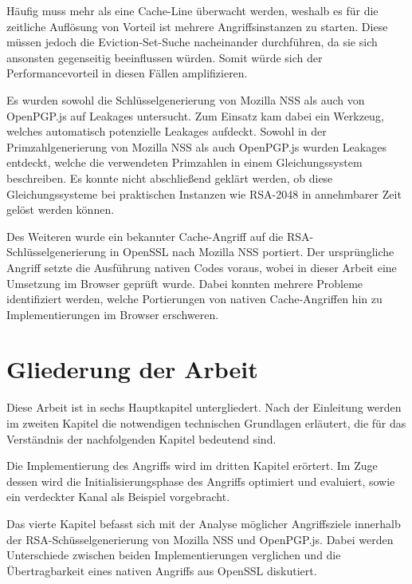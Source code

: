 Häufig muss mehr als eine Cache-Line überwacht werden, weshalb es für die zeitliche Auflösung von Vorteil ist mehrere Angriffsinstanzen zu starten.
Diese müssen jedoch die Eviction-Set-Suche nacheinander durchführen, da sie sich ansonsten gegenseitig beeinflussen würden.
Somit würde sich der Performancevorteil in diesen Fällen amplifizieren.

\par\medskip

Es wurden sowohl die Schlüsselgenerierung von Mozilla NSS als auch von OpenPGP.js auf Leakages untersucht. 
Zum Einsatz kam dabei ein Werkzeug, welches automatisch potenzielle Leakages aufdeckt.
Sowohl in der Primzahlgenerierung von Mozilla NSS als auch OpenPGP.js wurden Leakages entdeckt, welche die verwendeten Primzahlen in einem Gleichungssystem beschreiben.
Es konnte nicht abschließend geklärt werden, ob diese Gleichungssysteme bei praktischen Instanzen wie RSA-2048 in annehmbarer Zeit gelöst werden können.

Des Weiteren wurde ein bekannter Cache-Angriff auf die RSA-Schlüsselgenerierung in OpenSSL nach Mozilla NSS portiert.
Der ursprüngliche Angriff setzte die Ausführung nativen Codes voraus, wobei in dieser Arbeit eine Umsetzung im Browser geprüft wurde.
Dabei konnten mehrere Probleme identifiziert werden, welche Portierungen von nativen Cache-Angriffen hin zu Implementierungen im Browser erschweren. 

\section{Gliederung der Arbeit}
Diese Arbeit ist in sechs Hauptkapitel untergliedert. 
Nach der Einleitung werden im zweiten Kapitel die notwendigen technischen Grundlagen erläutert, die für das Verständnis der nachfolgenden Kapitel bedeutend sind.

Die Implementierung des Angriffs wird im dritten Kapitel erörtert. 
Im Zuge dessen wird die Initialisierungsphase des Angriffs optimiert und evaluiert, sowie ein verdeckter Kanal als Beispiel vorgebracht. 

Das vierte Kapitel befasst sich mit der Analyse möglicher Angriffsziele innerhalb der RSA-Schüsselgenerierung von Mozilla NSS und OpenPGP.js.
Dabei werden Unterschiede zwischen beiden Implementierungen verglichen und die Übertragbarkeit eines nativen Angriffs aus OpenSSL diskutiert.

